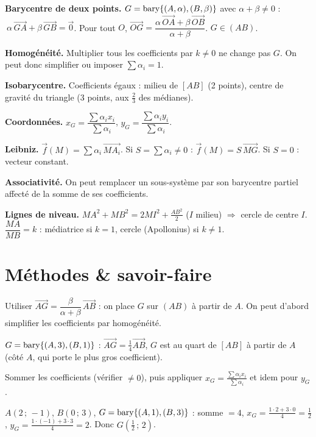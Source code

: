 \begin{synthese}
\textbf{Barycentre de deux points.} $G=\operatorname{bary}\{(A,\alpha),(B,\beta)\}$ avec
$\alpha+\beta\neq0$ : $\ \alpha\,\vec{GA}+\beta\,\vec{GB}=\vec{0}$. Pour tout $O$,
$\vec{OG}=\dfrac{\alpha\,\vec{OA}+\beta\,\vec{OB}}{\alpha+\beta}$. $G\in(AB)$.

\smallskip
\textbf{Homogénéité.} Multiplier tous les coefficients par $k\neq0$ ne change pas $G$.
On peut donc simplifier ou imposer $\sum\alpha_i=1$.

\smallskip
\textbf{Isobarycentre.} Coefficients égaux : milieu de $[AB]$ (2 points), centre de
gravité du triangle (3 points, aux $\tfrac23$ des médianes).

\smallskip
\textbf{Coordonnées.} $x_G=\dfrac{\sum\alpha_i x_i}{\sum\alpha_i}$,
$y_G=\dfrac{\sum\alpha_i y_i}{\sum\alpha_i}$.

\smallskip
\textbf{Leibniz.} $\vec{f}(M)=\sum\alpha_i\,\vec{MA_i}$. Si $S=\sum\alpha_i\neq0$ :
$\vec{f}(M)=S\,\vec{MG}$. Si $S=0$ : vecteur constant.

\smallskip
\textbf{Associativité.} On peut remplacer un sous-système par son barycentre partiel
affecté de la somme de ses coefficients.

\smallskip
\textbf{Lignes de niveau.} $MA^2+MB^2=2MI^2+\tfrac{AB^2}{2}$ ($I$ milieu) $\Rightarrow$
cercle de centre $I$. $\dfrac{MA}{MB}=k$ : médiatrice si $k=1$, cercle (Apollonius) si
$k\neq1$.
\end{synthese}

\section{Méthodes \& savoir-faire}

Utiliser $\vec{AG}=\dfrac{\beta}{\alpha+\beta}\,\vec{AB}$ : on place $G$ sur $(AB)$ à
partir de $A$. On peut d'abord simplifier les coefficients par homogénéité.
\begin{exemple}
$G=\operatorname{bary}\{(A,3),(B,1)\}$ : $\vec{AG}=\tfrac{1}{4}\vec{AB}$, $G$ est au quart de $[AB]$
à partir de $A$ (côté $A$, qui porte le plus gros coefficient).
\end{exemple}

Sommer les coefficients (vérifier $\neq0$), puis appliquer
$x_G=\tfrac{\sum\alpha_i x_i}{\sum\alpha_i}$ et idem pour $y_G$.
\begin{exemple}
$A(2\,;\,-1)$, $B(0\,;\,3)$, $G=\operatorname{bary}\{(A,1),(B,3)\}$ : somme $=4$,
$x_G=\tfrac{1\cdot2+3\cdot0}{4}=\tfrac12$, $y_G=\tfrac{1\cdot(-1)+3\cdot3}{4}=2$.
Donc $G\!\left(\tfrac12\,;\,2\right)$.
\end{exemple}

